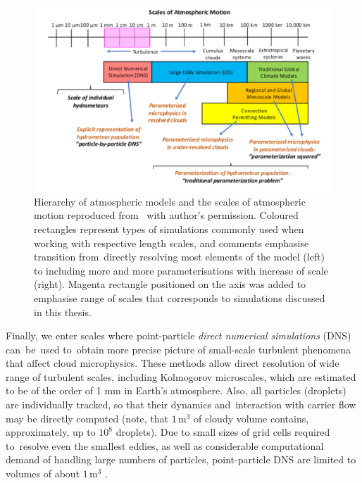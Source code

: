\documentclass{pracamgren}
\begin{document}
\begin{figure}[h]
\centering
\includegraphics[width=13cm]{img/figs/atmo-scales.png}
\caption{
Hierarchy of atmospheric models and the scales of atmospheric motion reproduced from~\textcite{Morrison2020} with author's permission.
Coloured rectangles represent types of simulations commonly used when working with respective length scales, and comments emphasise transition from~directly resolving most elements of the model (left) to including more and more parameterisations with increase of scale (right).
Magenta rectangle positioned on the axis was added to emphasise range of scales that corresponds to simulations discussed in this thesis.
}
\label{fig:atmo-scales}
\end{figure}

Finally, we enter scales where point-particle \emph{direct numerical simulations} (DNS) can~be~used to~obtain more precise picture of small-scale turbulent phenomena that affect cloud microphysics.
These methods allow direct resolution of wide range of turbulent scales, including Kolmogorov microscales, which are estimated to be of the order of 1 mm in Earth's atmosphere.
Also, all particles (droplets) are individually tracked, so that their dynamics and~interaction with carrier flow may be directly computed (note, that $1 \, \text{m}^{3}$ of cloudy volume contains, approximately, up to $10^{8}$ droplets).
Due to small sizes of grid cells required to~resolve even the smallest eddies, as well as considerable computational demand of handling large numbers of particles, point-particle DNS are limited to volumes of about $1 \, \text{m}^{3}$ \parencite{Morrison2020}.
\end{document}
